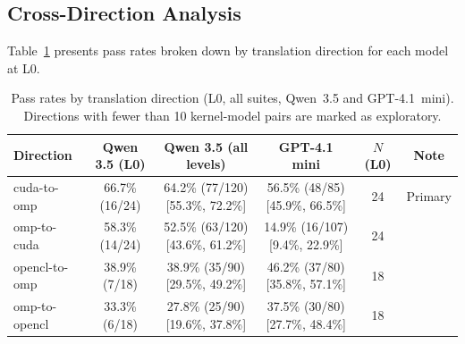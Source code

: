 \documentclass[conference]{IEEEtran}
\begin{document}
\subsection{Cross-Direction Analysis}
\label{sec:direction-analysis}

Table~\ref{tab:direction-rates} presents pass rates broken down by translation direction for each model at L0.

\begin{table}[t]
\centering
\caption{Pass rates by translation direction (L0, all suites, Qwen~3.5 and GPT-4.1~mini). Directions with fewer than 10 kernel-model pairs are marked as exploratory.}
\label{tab:direction-rates}
\small
\begin{tabular}{@{}lccccc@{}}
\toprule
Direction & Qwen 3.5 (L0) & Qwen 3.5 (all levels) & GPT-4.1 mini & $N$ (L0) & Note \\
\midrule
cuda-to-omp & 66.7\% (16/24) & 64.2\% (77/120) [55.3\%, 72.2\%] & 56.5\% (48/85) [45.9\%, 66.5\%] & 24 & Primary \\ %
omp-to-cuda & 58.3\% (14/24) & 52.5\% (63/120) [43.6\%, 61.2\%] & 14.9\% (16/107) [9.4\%, 22.9\%] & 24 & \\ %
opencl-to-omp & 38.9\% (7/18) & 38.9\% (35/90) [29.5\%, 49.2\%] & 46.2\% (37/80) [35.8\%, 57.1\%] & 18 & \\ %
omp-to-opencl & 33.3\% (6/18) & 27.8\% (25/90) [19.6\%, 37.8\%] & 37.5\% (30/80) [27.7\%, 48.4\%] & 18 & \\ %

\end{tabular}
\end{table}
\end{document}
